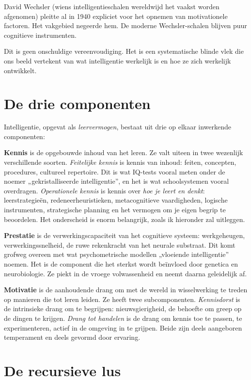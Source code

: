 \documentclass[11pt, twoside, openright]{book}
\begin{document}
David Wechsler (wiens intelligentieschalen wereldwijd het vaakst worden afgenomen) pleitte al in 1940 expliciet voor het opnemen van motivationele factoren. Het vakgebied negeerde hem. De moderne Wechsler-schalen blijven puur cognitieve instrumenten.

Dit is geen onschuldige vereenvoudiging. Het is een systematische blinde vlek die ons beeld vertekent van wat intelligentie werkelijk is en hoe ze zich werkelijk ontwikkelt.

\section*{De drie componenten}

Intelligentie, opgevat als \textit{leervermogen}, bestaat uit drie op elkaar inwerkende componenten:

\textbf{Kennis} is de opgebouwde inhoud van het leren. Ze valt uiteen in twee wezenlijk verschillende soorten. \textit{Feitelijke kennis} is kennis van inhoud: feiten, concepten, procedures, cultureel repertoire. Dit is wat IQ-tests vooral meten onder de noemer „gekristalliseerde intelligentie”, en het is wat schoolsystemen vooral overdragen. \textit{Operationele kennis} is kennis over \textit{hoe je leert en denkt}: leerstrategieën, redeneerheuristieken, metacognitieve vaardigheden, logische instrumenten, strategische planning en het vermogen om je eigen begrip te beoordelen. Het onderscheid is enorm belangrijk, zoals ik hieronder zal uitleggen.

\textbf{Prestatie} is de verwerkingscapaciteit van het cognitieve systeem: werkgeheugen, verwerkingssnelheid, de ruwe rekenkracht van het neurale substraat. Dit komt grofweg overeen met wat psychometrische modellen „vloeiende intelligentie” noemen. Het is de component die het sterkst wordt beïnvloed door genetica en neurobiologie. Ze piekt in de vroege volwassenheid en neemt daarna geleidelijk af.

\textbf{Motivatie} is de aanhoudende drang om met de wereld in wisselwerking te treden op manieren die tot leren leiden. Ze heeft twee subcomponenten. \textit{Kennisdorst} is de intrinsieke drang om te begrijpen: nieuwsgierigheid, de behoefte om greep op de dingen te krijgen. \textit{Drang tot handelen} is de drang om kennis toe te passen, te experimenteren, actief in de omgeving in te grijpen. Beide zijn deels aangeboren temperament en deels gevormd door ervaring.

\section*{De recursieve lus}
\end{document}
